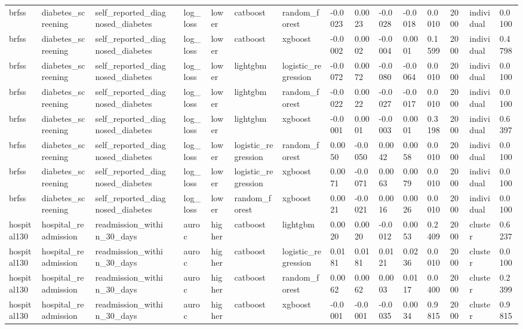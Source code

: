 \begin{tabular}{llllllllllllllll}
brfss & diabetes\_screening & self\_reported\_diagnosed\_diabetes &  & log\_loss & lower & catboost & random\_forest & -0.0023 & 0.0023 & -0.0028 & -0.0018 & 0.0010 & 2000 & individual & 0.0100 \\
brfss & diabetes\_screening & self\_reported\_diagnosed\_diabetes &  & log\_loss & lower & catboost & xgboost & -0.0002 & 0.0002 & -0.0004 & 0.0001 & 0.1599 & 2000 & individual & 0.4798 \\
brfss & diabetes\_screening & self\_reported\_diagnosed\_diabetes &  & log\_loss & lower & lightgbm & logistic\_regression & -0.0072 & 0.0072 & -0.0080 & -0.0064 & 0.0010 & 2000 & individual & 0.0100 \\
brfss & diabetes\_screening & self\_reported\_diagnosed\_diabetes &  & log\_loss & lower & lightgbm & random\_forest & -0.0022 & 0.0022 & -0.0027 & -0.0017 & 0.0010 & 2000 & individual & 0.0100 \\
brfss & diabetes\_screening & self\_reported\_diagnosed\_diabetes &  & log\_loss & lower & lightgbm & xgboost & -0.0001 & 0.0001 & -0.0003 & 0.0001 & 0.3198 & 2000 & individual & 0.6397 \\
brfss & diabetes\_screening & self\_reported\_diagnosed\_diabetes &  & log\_loss & lower & logistic\_regression & random\_forest & 0.0050 & -0.0050 & 0.0042 & 0.0058 & 0.0010 & 2000 & individual & 0.0100 \\
brfss & diabetes\_screening & self\_reported\_diagnosed\_diabetes &  & log\_loss & lower & logistic\_regression & xgboost & 0.0071 & -0.0071 & 0.0063 & 0.0079 & 0.0010 & 2000 & individual & 0.0100 \\
brfss & diabetes\_screening & self\_reported\_diagnosed\_diabetes &  & log\_loss & lower & random\_forest & xgboost & 0.0021 & -0.0021 & 0.0016 & 0.0026 & 0.0010 & 2000 & individual & 0.0100 \\
hospital130 & hospital\_readmission & readmission\_within\_30\_days &  & auroc & higher & catboost & lightgbm & 0.0020 & 0.0020 & -0.0012 & 0.0053 & 0.2409 & 2000 & cluster & 0.6237 \\
hospital130 & hospital\_readmission & readmission\_within\_30\_days &  & auroc & higher & catboost & logistic\_regression & 0.0181 & 0.0181 & 0.0121 & 0.0236 & 0.0010 & 2000 & cluster & 0.0100 \\
hospital130 & hospital\_readmission & readmission\_within\_30\_days &  & auroc & higher & catboost & random\_forest & 0.0062 & 0.0062 & 0.0003 & 0.0117 & 0.0400 & 2000 & cluster & 0.2399 \\
hospital130 & hospital\_readmission & readmission\_within\_30\_days &  & auroc & higher & catboost & xgboost & -0.0001 & -0.0001 & -0.0035 & 0.0034 & 0.9815 & 2000 & cluster & 0.9815 \\

\end{tabular}
